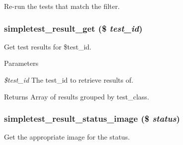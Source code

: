 \label{simpletest_8pages_8inc_aa49754acf61555f23482a0257db56da2}
Re-\/run the tests that match the filter. \hypertarget{simpletest_8pages_8inc_a36d253fe9ff7de21a484f1bb0ff9b5a6}{
\subsubsection[{simpletest\_\-result\_\-get}]{\setlength{\rightskip}{0pt plus 5cm}simpletest\_\-result\_\-get (\$ {\em test\_\-id})}}
\label{simpletest_8pages_8inc_a36d253fe9ff7de21a484f1bb0ff9b5a6}
Get test results for \$test\_\-id.


\begin{DoxyParams}{Parameters}
\item[{\em \$test\_\-id}]The test\_\-id to retrieve results of. \end{DoxyParams}
\begin{DoxyReturn}{Returns}
Array of results grouped by test\_\-class. 
\end{DoxyReturn}
\hypertarget{simpletest_8pages_8inc_a113abd1a787e904816f29e409b4385ea}{
\subsubsection[{simpletest\_\-result\_\-status\_\-image}]{\setlength{\rightskip}{0pt plus 5cm}simpletest\_\-result\_\-status\_\-image (\$ {\em status})}}
\label{simpletest_8pages_8inc_a113abd1a787e904816f29e409b4385ea}
Get the appropriate image for the status.


